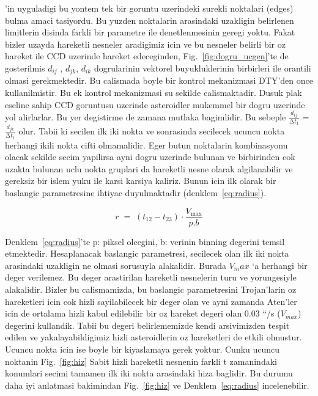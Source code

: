 \documentclass[review]{elsarticle}
\begin{document}
\citep{chen2001}'in uyguladigi bu yontem tek bir goruntu uzerindeki surekli noktalari (edges) bulma amaci tasiyordu. Bu yuzden noktalarin arasindaki uzakligin belirlenen limitlerin disinda farkli bir parametre ile denetlenmesinin geregi yoktu. Fakat bizler uzayda hareketli nesneler aradigimiz icin ve bu nesneler belirli bir oz hareket ile CCD uzerinde hareket edeceginden, Fig.~\ref{fig:dogru_ucgen}'te de gosterilmis $d_{ij}$ , $d_{jk}$, $d_{ik}$ dogrularinin vektorel buyukluklerinin birbirleri ile orantili olmasi gerekmektedir. Bu calismada boyle bir kontrol mekanizmasi DTY'den once kullanilmistir. Bu ek kontrol mekanizmasi su sekilde calismaktadir. Dusuk plak eseline sahip CCD goruntusu uzerinde asteroidler mukemmel bir dogru uzerinde yol alirlarlar. Bu yer degistirme de zamana mutlaka bagimlidir. Bu sebeple $\frac{d_{ij}}{∆t_{1}}$ = $\frac{d_{jk}}{∆t_{1}}$ olur. Tabii ki secilen ilk iki nokta ve sonrasinda secilecek ucuncu nokta herhangi ikili nokta cifti olmamalidir. Eger butun noktalarin kombinasyonu olacak sekilde secim yapilirsa ayni dogru uzerinde bulunan ve birbirinden cok uzakta bulunan uclu nokta gruplari da hareketli nesne olarak algilanabilir ve gereksiz bir islem yuku ile karsi karsiya kaliriz. Bunun icin ilk olarak bir baslangic parametresine ihtiyac duyulmaktadir (denklem~\ref{eq:radius}).

\begin{equation} \label{eq:radius}
r\; =\; \left( t_{12}-t_{23} \right)\cdot \frac{V_{\max }}{p.b}
\end{equation}

Denklem~\ref{eq:radius}'te p: piksel olcegini, b: verinin binning degerini temsil etmektedir. Hesaplanacak baslangic parametresi, secilecek olan ilk iki nokta arasindaki uzakligin ne olmasi sorusuyla alakalidir. Burada $V_max$ ‘a herhangi bir deger verilemez. Bu deger arastirilan hareketli nesnelerin turu ve yorungesiyle alakalidir. Bizler bu calismamizda, bu baslangic parametresini Trojan'larin oz hareketleri icin cok hizli sayilabilecek bir deger olan ve ayni zamanda Aten'ler icin de ortalama hizli kabul edilebilir bir oz hareket degeri olan $0.03$ “/s ($V_{max}$)  degerini kullandik. Tabii bu degeri belirlememizde kendi arsivimizden tespit edilen ve yakalayabildigimiz hizli asteroidlerin oz hareketleri de etkili olmustur. Ucuncu nokta icin ise boyle bir kiyaslamaya gerek yoktur. Cunku ucuncu noktanin
Fig.~\ref{fig:hiz} Sabit hizli hareketli nesnenin farkli t zamanindaki konumlari secimi tamamen ilk iki nokta arasindaki hiza baglidir.  Bu durumu daha iyi anlatmasi bakimindan Fig.~\ref{fig:hiz} ve Denklem~\ref{eq:radius} incelenebilir.
\end{document}
